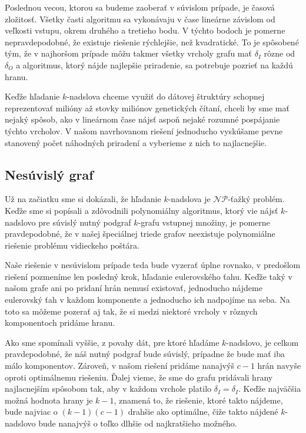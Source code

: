 Poslednou vecou, ktorou sa budeme zaoberať v súvislom prípade, je časová zložitosť. Všetky časti
algoritmu sa vykonávaju v čase lineárne závislom od veľkosti vstupu, okrem druhého a tretieho bodu.
V týchto bodoch je pomerne nepravdepodobné, že existuje riešenie rýchlejšie, než kvadratické. To je
spôsobené tým, že v najhoršom prípade môžu takmer všetky vrcholy grafu mať $\delta_I$ rôzne od $\delta_O$
a algoritmus, ktorý nájde najlepšie priradenie, sa potrebuje pozrieť na každú hranu.

Keďže hľadanie
$k$-nadslova chceme využiť do dátovej štruktúry schopnej reprezentovať milióny až stovky miliónov
genetických čítaní, chceli by sme mať nejaký spôsob, ako v lineárnom čase nájsť aspoň nejaké rozumné
pospájanie týchto vrcholov. V našom navrhovanom riešení jednoducho vyskúšame pevne stanovený počet
náhodných priradení a vyberieme z nich to najlacnejšie.

\subsection{Nesúvislý graf}

Už na začiatku sme si dokázali, že hľadanie $k$-nadslova je $\mathcal{NP}$-ťažký problém. Keďže
sme si popísali a zdôvodnili polynomiálny algoritmus, ktorý vie nájsť $k$-nadslovo pre súvislý
nutný podgraf $k$-grafu vstupnej množiny, je pomerne pravdepodobné, že v našej špeciálnej
triede grafov neexistuje polynomiálne riešenie problému vidieckeho poštára.

Naše riešenie v nesúvislom prípade teda bude vyzerať úplne rovnako, v predošlom
riešení pozmeníme len posledný krok, hľadanie eulerovského ťahu. Keďže taký v našom grafe
ani po pridaní hrán nemusí existovať, jednoducho nájdeme eulerovský ťah v každom komponente
a jednoducho ich nadpojíme na seba. Na toto sa môžeme pozerať aj tak, že si medzi niektoré
vrcholy v rôznych komponentoch pridáme hranu.

Ako sme spomínali vyššie, z povahy dát, pre ktoré hľadáme $k$-nadslovo,
je celkom pravdepodobné, že náš nutný podgraf bude súvislý, prípadne že bude mať iba málo
komponentov. Zároveň, v našom riešení pridáme nanajvýš $c - 1$ hrán navyše oproti
optimálnemu riešeniu. Ďalej vieme, že sme do grafu pridávali hrany najlacnejším spôsobom
tak, aby v každom vrchole platilo $\delta_I = \delta_I$. Keďže najväčšia možná hodnota
hrany je $k-1$, znamená to, že riešenie, ktoré takto nájdeme, bude najviac o $(k - 1)(c - 1)$ drahšie
ako optimálne, čiže takto nájdené $k$-nadslovo bude nanajvýš o toľko dlhšie od najkratšieho možného.
